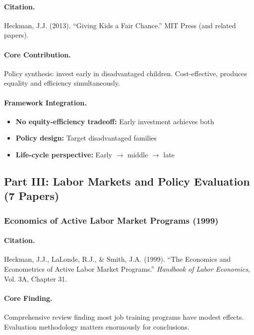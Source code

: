 \paragraph{Citation.}
Heckman, J.J. (2013). ``Giving Kids a Fair Chance.''
MIT Press (and related papers).

\paragraph{Core Contribution.}
Policy synthesis: invest early in disadvantaged children.
Cost-effective, produces equality and efficiency simultaneously.

\paragraph{Framework Integration.}
\begin{itemize}
  \item \textbf{No equity-efficiency tradeoff:} Early investment achieves both
  \item \textbf{Policy design:} Target disadvantaged families
  \item \textbf{Life-cycle perspective:} Early $\to$ middle $\to$ late
\end{itemize}

\subsection{Part III: Labor Markets and Policy Evaluation (7 Papers)}

\subsubsection{Economics of Active Labor Market Programs (1999)}

\paragraph{Citation.}
Heckman, J.J., LaLonde, R.J., \& Smith, J.A. (1999).
``The Economics and Econometrics of Active Labor Market Programs.''
\emph{Handbook of Labor Economics}, Vol. 3A, Chapter 31.

\paragraph{Core Finding.}
Comprehensive review finding most job training programs have modest effects.
Evaluation methodology matters enormously for conclusions.

